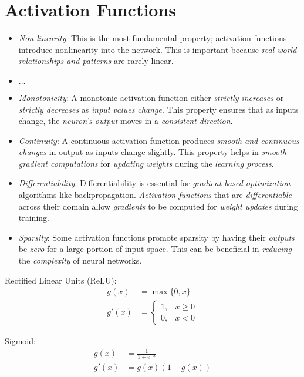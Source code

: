 \documentclass[
	number={8},
	title={Artificial Neural Network}
]{cs584notes}
\begin{document}
\section{Activation Functions}\label{sec:activation-functions}
\begin{itemize}
	\item \emph{Non-linearity}: This is the most fundamental property; activation functions introduce nonlinearity into the network.
	This is important because \emph{real-world relationships and patterns} are rarely linear.
	\item $\dots$
	\item \emph{Monotonicity}: A monotonic activation function either \emph{strictly increases} or \emph{strictly decreases} as \emph{input values change}.
	This property ensures that as inputs change, the \emph{neuron's output} moves in a \emph{consistent direction}.
	\item \emph{Continuity}: A continuous activation function produces \emph{smooth and continuous changes} in output as inputs change slightly.
	This property helps in \emph{smooth gradient computations} for \emph{updating weights} during the \emph{learning process}.
	\item \emph{Differentiability}: Differentiability is essential for \emph{gradient-based optimization} algorithms like backpropagation.
	\emph{Activation functions} that are \emph{differentiable} across their domain allow \emph{gradients} to be computed for \emph{weight updates} during training.
	\item \emph{Sparsity}: Some activation functions promote sparsity by having their \emph{outputs} be \emph{zero} for a large portion of input space.
	This can be beneficial in \emph{reducing} the \emph{complexity} of neural networks.
\end{itemize}
Rectified Linear Units (ReLU):
\begin{equation}
	\begin{aligned}
		g(x) &= \max\{0, x\}\\
		g'(x) &= \left\{ \begin{array}{cl}
			1, & x \geq 0\\
			0, & x < 0
		\end{array} \right.
	\end{aligned}
	\label{eq:relu}
\end{equation}

Sigmoid:
\begin{equation}
	\begin{aligned}
		g(x) &= \frac{1}{1 + e^{-x}}\\
		g'(x) &= g(x)\left( 1 - g(x) \right)
	\end{aligned}
	\label{eq:sigmoid}
\end{equation}
\end{document}
